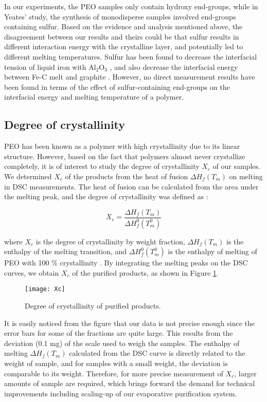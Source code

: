 In our experiments, the PEO samples only contain hydroxy end-groups, while in Yeates' study, the synthesis of monodisperse samples involved end-groups containing sulfur. Based on the evidence and analysis mentioned above, the  disagreement between our results and theirs could be that sulfur results in different interaction energy with the crystalline layer, and potentially led to different melting temperatures. Sulfur has been found to decrease the interfacial tension of liquid iron with $\text{Al}_{\text{2}}\text{O}_{\text{3}}$ \cite{Halden1955}, and also decrease the interfacial energy between Fe-C melt and graphite \cite{Jung2005}. However, no direct measurement results have been found in terms of the effect of sulfur-containing end-groups on the interfacial energy and melting temperature of a polymer.

\subsection{Degree of crystallinity}

PEO has been known as a polymer with high crystallinity due to its linear structure. However, based on the fact that polymers almost never crystallize completely, it is of interest to study the degree of crystallinity $X_{c}$ of our samples. We determined $X_{c}$ of the products from the heat of fusion $\Delta H_{f} (T_{m})$ on melting in DSC measurements. The heat of fusion can be calculated from the area under the melting peak, and the degree of crystallinity was defined as \cite{Pielichowski2002}:

\begin{equation}
\label{eqn_Xc}
X_{c} = \dfrac{\Delta H_{f} (T_{m})}{\Delta H_{f}^{0} (T_{m}^{0})}
\end{equation}

\noindent
where $X_{c}$ is the degree of crystallinity by weight fraction, $\Delta H_{f} (T_{m})$ is the enthalpy of the melting transition, and $\Delta H_{f}^{0} (T_{m}^{0})$ is the enthalpy of melting of PEO with 100 \% crystallinity \cite{Pielichowski2002}. By integrating the melting peaks on the DSC curves, we obtain $X_{c}$ of the purified products, as shown in Figure \ref{fig:Xc}.

\begin{figure}[H]
\center
\texttt{[image: Xc]}
\caption{Degree of crystallinity of purified products.}
\label{fig:Xc}
\end{figure}

It is easily noticed from the figure that our data is not precise enough since the error bars for some of the fractions are quite large. This results from the deviation (0.1 mg) of the scale used to weigh the samples. The enthalpy of melting $\Delta H_{f} (T_{m})$ calculated from the DSC curve is directly related to the weight of sample, and for samples with a small weight, the deviation is comparable to its weight. Therefore, for more precise measurement of $X_{c}$, larger amounts of sample are required, which brings forward the demand for technical improvements including scaling-up of our evaporative purification system.

